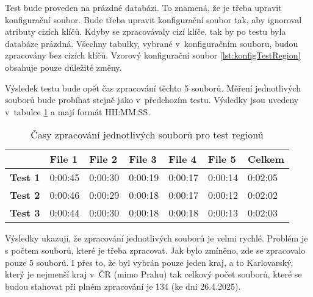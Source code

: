 Test bude proveden na prázdné databázi. To znamená, že je třeba upravit konfigurační soubor.
Bude třeba upravit konfigurační soubor tak, aby ignoroval atributy cizích klíčů.
Kdyby se zpracovávaly cizí klíče, tak by po testu byla databáze prázdná.
Všechny tabulky, vybrané v~konfiguračním souboru, budou zpracovány bez cizích klíčů.
Vzorový konfigurační soubor \ref{lst:konfigTestRegion} obsahuje pouze důležité změny.

Výsledek testu bude opět čas zpracování těchto 5 souborů.
Měření jednotlivých souborů bude probíhat stejně jako v~předchozím testu.
Výsledky jsou uvedeny v~tabulce \ref{tab:test2} a mají formát HH:MM:SS.

\begin{table}[!h]
  \centering
  \caption{Časy zpracování jednotlivých souborů pro test regionů}
  \label{tab:test2}
  \begin{tabular}{|l|l|l|l|l|l|l|}
  \hline
                  & \textbf{File 1} & \textbf{File 2} & \textbf{File 3} & \textbf{File 4} & \textbf{File 5} & \textbf{Celkem} \\ \hline
  \textbf{Test 1} & 0:00:45         & 0:00:30         & 0:00:19         & 0:00:17         & 0:00:14         & 0:02:05         \\ \hline
  \textbf{Test 2} & 0:00:46         & 0:00:29         & 0:00:18         & 0:00:17         & 0:00:12         & 0:02:02         \\ \hline
  \textbf{Test 3} & 0:00:44         & 0:00:30         & 0:00:18         & 0:00:18         & 0:00:13         & 0:02:03         \\ \hline
  \end{tabular}
\end{table}

Výsledky ukazují, že zpracování jednotlivých souborů je velmi rychlé.
Problém je s počtem souborů, které je třeba zpracovat. Jak bylo zmíněno,
zde se zpracovalo pouze 5 souborů. I přes to, že byl vybrán pouze jeden kraj,
a to Karlovarský, který je nejmenší kraj v~ČR (mimo Prahu) tak celkový počet souborů,
které se budou stahovat při plném zpracování je 134 (ke dni 26.4.2025).

\newpage

